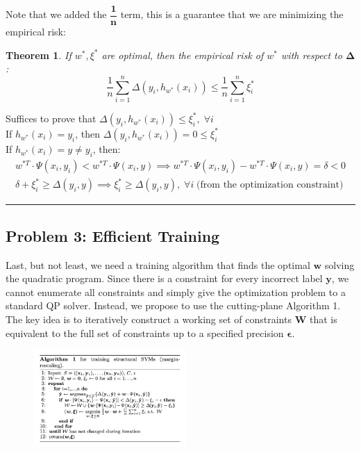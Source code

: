 \documentclass[twoside]{article}
\newcounter{lecnum}
\newtheorem{theorem}{Theorem}[lecnum]
\newenvironment{proof}{{\bf Proof:}}{\hfill\rule{2mm}{2mm}}
\begin{document}
Note that we added the $\mathbf{\dfrac{1}{n}}$ term, this is a guarantee that we are minimizing the empirical risk:

\begin{theorem}
If $w^*,\xi^*$ are optimal, then the empirical risk of $w^*$ with respect to $\mathbf{\Delta}$:
\begin{equation*}
    \dfrac{1}{n} \sum_{i=1}^{n}\Delta(y_{i},h_{w^*}(x_{i})) \leq \dfrac{1}{n} \sum_{i=1}^{n} \xi_{i}^*
\end{equation*}
\end{theorem}
\begin{proof}
Suffices to prove that  $\Delta(y_{i},h_{w^*}(x_{i})) \leq \xi_{i}^*,  \; \forall i$ \\

If $h_{w^*}(x_{i}) = y_{i}$, then $\Delta(y_{i},h_{w^*}(x_{i})) = 0 \leq \xi_{i}^*$ \\

If $h_{w^*}(x_{i}) = y \not = y_{i}$, then:
\begin{align*}
       w^{*T}\cdot \Psi(x_{i},y_{i}) < w^{*T} \cdot \Psi(x_{i},y) \implies w^{*T}\cdot \Psi(x_{i},y_{i}) - w^{*T} \cdot \Psi(x_{i},y) = \delta < 0\\      \delta + \xi_{i}^* \geq \Delta(y_{i},y)  \implies  \xi_{i}^* \geq \Delta(y_{i},y)  , \;\forall i \; \text{(from the optimization constraint)}
\end{align*}
\end{proof}


\subsection{Problem 3: Efficient Training}

Last, but not least, we need a training algorithm that finds
the optimal $\mathbf{w}$ solving the quadratic program. Since
there is a constraint for every incorrect label $\mathbf{y}$, we cannot
enumerate all constraints and simply give the optimization problem to a standard QP solver. Instead, we propose to use the cutting-plane Algorithm 1. The key idea is to iteratively construct
a working set of constraints $\mathbf{W}$ that is equivalent to the full
set of constraints  up to a specified precision $\mathbf{\epsilon}$.

\begin{figure}[h]
\centering
\includegraphics[width=0.52\textwidth]{img/struct_algo.png}
\end{figure}
\end{document}
